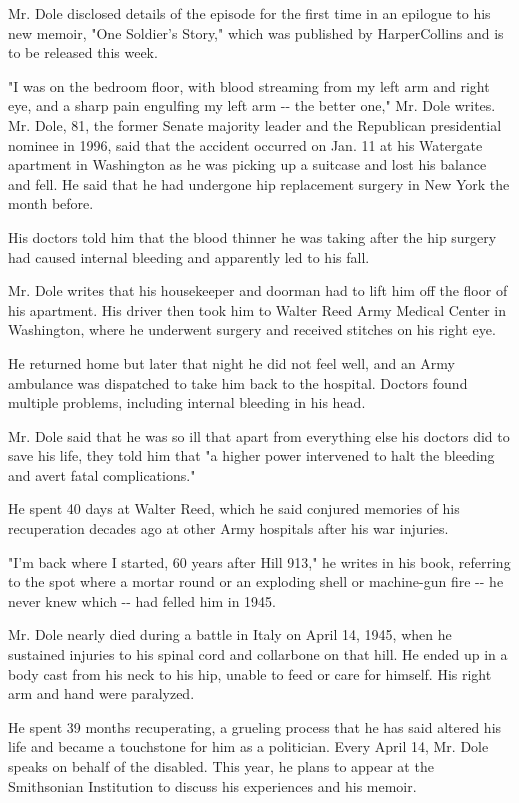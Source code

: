 Mr. Dole disclosed details of the episode for the first time in an
epilogue to his new memoir, "One Soldier's Story," which was published
by HarperCollins and is to be released this week.

"I was on the bedroom floor, with blood streaming from my left arm and
right eye, and a sharp pain engulfing my left arm -\/- the better one,"
Mr. Dole writes. Mr. Dole, 81, the former Senate majority leader and the
Republican presidential nominee in 1996, said that the accident occurred
on Jan. 11 at his Watergate apartment in Washington as he was picking up
a suitcase and lost his balance and fell. He said that he had undergone
hip replacement surgery in New York the month before.

His doctors told him that the blood thinner he was taking after the hip
surgery had caused internal bleeding and apparently led to his fall.

Mr. Dole writes that his housekeeper and doorman had to lift him off the
floor of his apartment. His driver then took him to Walter Reed Army
Medical Center in Washington, where he underwent surgery and received
stitches on his right eye.

He returned home but later that night he did not feel well, and an Army
ambulance was dispatched to take him back to the hospital. Doctors found
multiple problems, including internal bleeding in his head.

Mr. Dole said that he was so ill that apart from everything else his
doctors did to save his life, they told him that "a higher power
intervened to halt the bleeding and avert fatal complications."

He spent 40 days at Walter Reed, which he said conjured memories of his
recuperation decades ago at other Army hospitals after his war injuries.

"I'm back where I started, 60 years after Hill 913," he writes in his
book, referring to the spot where a mortar round or an exploding shell
or machine-gun fire -\/- he never knew which -\/- had felled him in
1945.

Mr. Dole nearly died during a battle in Italy on April 14, 1945, when he
sustained injuries to his spinal cord and collarbone on that hill. He
ended up in a body cast from his neck to his hip, unable to feed or care
for himself. His right arm and hand were paralyzed.

He spent 39 months recuperating, a grueling process that he has said
altered his life and became a touchstone for him as a politician. Every
April 14, Mr. Dole speaks on behalf of the disabled. This year, he plans
to appear at the Smithsonian Institution to discuss his experiences and
his memoir.

